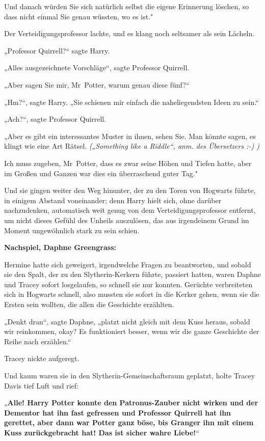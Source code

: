 {Und danach würden Sie sich natürlich selbst die eigene Erinnerung löschen, so dass nicht einmal Sie genau wüssten, wo es ist."

Der Verteidigungsprofessor lachte, und es klang noch seltsamer als sein Lächeln.

„Professor Quirrell?“ sagte Harry.

„Alles ausgezeichnete Vorschläge“, sagte Professor Quirrell.

„Aber sagen Sie mir, Mr~Potter, warum genau diese fünf?“

„Hm?“, sagte Harry. „Sie schienen mir einfach die naheliegendsten Ideen zu sein.“

„Ach?“, sagte Professor Quirrell.

„Aber es gibt ein interessantes Muster in ihnen, sehen Sie. Man könnte sagen, es klingt wie eine Art Rätsel. \emph{(„Something like a Riddle“, anm. des Übersetzers :-) )}

Ich muss zugeben, Mr~Potter, dass es zwar seine Höhen und Tiefen hatte, aber im Großen und Ganzen war dies ein überraschend guter Tag."

Und sie gingen weiter den Weg hinunter, der zu den Toren von Hogwarts führte, in einigem Abstand voneinander; denn Harry hielt sich, ohne darüber nachzudenken, automatisch weit genug von dem Verteidigungsprofessor entfernt, um nicht dieses Gefühl des Unheils auszulösen, das aus irgendeinem Grund im Moment ungewöhnlich stark zu sein schien.

\textbf{Nachspiel, Daphne Greengrass:}

Hermine hatte sich geweigert, irgendwelche Fragen zu beantworten, und sobald sie den Spalt, der zu den Slytherin-Kerkern führte, passiert hatten, waren Daphne und Tracey sofort losgelaufen, so schnell sie nur konnten. Gerüchte verbreiteten sich in Hogwarts schnell, also mussten sie sofort in die Kerker gehen, wenn sie die Ersten sein wollten, die allen die Geschichte erzählten.

„Denkt dran“, sagte Daphne, „platzt nicht gleich mit dem Kuss heraus, sobald wir reinkommen, okay? Es funktioniert besser, wenn wir die ganze Geschichte der Reihe nach erzählen.“

Tracey nickte aufgeregt.

Und kaum waren sie in den Slytherin-Gemeinschaftsraum geplatzt, holte Tracey Davis tief Luft und rief:

„\textbf{Alle! Harry Potter konnte den Patronus-Zauber nicht wirken und der Dementor hat ihn fast gefressen und Professor Quirrell hat ihn gerettet, aber dann war Potter ganz böse, bis Granger ihn mit einem Kuss zurückgebracht hat! Das ist sicher wahre Liebe!}“

}

